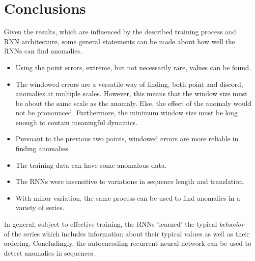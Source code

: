 \section{Conclusions}

Given the results, which are influenced by the described training process and RNN architecture, some general statements can be made about how well the RNNs can find anomalies.

\begin{itemize}

\item 
  Using the point errors, extreme, but not necessarily rare, values can be found.

\item
  The windowed errors are a versatile way of finding, both point and discord, anomalies at multiple scales.
  However, this means that the window size must be about the same scale as the anomaly.
  Else, the effect of the anomaly would not be pronounced.
  Furthermore, the minimum window size must be long enough to contain meaningful dynamics.

\item
  Pursuant to the previous two points, windowed errors are more reliable in finding anomalies.

\item
  The training data can have some anomalous data.

\item
  The RNNs were insensitive to variations in sequence length and translation.

\item
  With minor variation, the same process can be used to find anomalies in a variety of series.

\end{itemize}

In general, subject to effective training, the RNNs `learned' the typical \emph{behavior} of the series which includes information about their typical values as well as their ordering.
%
Concludingly, the autoencoding recurrent neural network can be used to detect anomalies in sequences.



